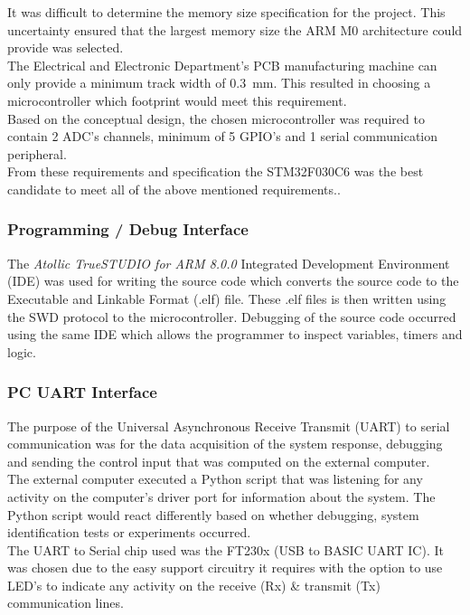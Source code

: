 It was difficult to determine the memory size specification for the project. This uncertainty ensured that the largest memory size the ARM M0 architecture could provide was selected.\\

The Electrical and Electronic Department's PCB manufacturing machine can only provide a  minimum track width of \SI{0.3}{mm}. This resulted in choosing a microcontroller which footprint would meet this requirement.\\

Based on the conceptual design, the chosen microcontroller was required to contain 2 ADC's channels, minimum of 5 GPIO's and 1 serial communication peripheral.\\

From these requirements and specification the STM32F030C6 was the best candidate to meet all of the above mentioned requirements..

\subsubsection{Programming / Debug Interface}
The \textit{Atollic TrueSTUDIO for ARM 8.0.0} Integrated Development Environment (IDE) was used for writing the source code which converts the source code to the Executable and Linkable Format (.elf) file. These .elf files is then written using the SWD protocol to the microcontroller. Debugging of the source code occurred using the same IDE which allows the programmer to inspect variables, timers and logic.

\subsubsection{PC UART Interface }

The purpose of the Universal Asynchronous Receive Transmit (UART) to serial communication was for the data acquisition of the system response, debugging and sending the control input that was computed on the external computer.\\

The external computer executed a Python script that was listening for any activity on the computer's driver port for information about the system. The Python script would react differently based on whether debugging, system identification tests or experiments occurred.\\

The UART to Serial chip used was the FT230x (USB to BASIC UART IC). It was chosen due to the easy support circuitry it requires with the option to use LED's to indicate any activity on the receive (Rx)  \& transmit (Tx) communication lines.\\

